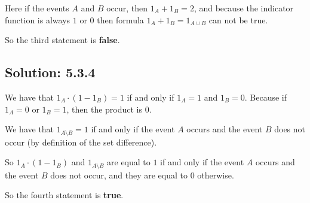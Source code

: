 Here if the events $A$ and $B$ occur, then $1_A + 1_B = 2$, and because the indicator function
is always $1$ or $0$ then formula $1_A + 1_B = 1_{A\cup B}$ can not be true.

So the third statement is \textbf{false}.


\subsection*{Solution: 5.3.4}

We have that $1_A \cdot (1 - 1_B) = 1$ if and only if $1_A = 1$ and $1_B = 0$.
Because if $1_A = 0$ or $1_B = 1$, then the product is $0$.

We have that $1_{A\setminus B} = 1$ if and only if the event $A$ occurs
and the event $B$ does not occur (by definition of the set difference).

So $1_A \cdot (1 - 1_B)$ and $1_{A\setminus B}$ are equal to $1$ if and only if
the event $A$ occurs and the event $B$ does not occur, and they are equal to $0$ otherwise.

So the fourth statement is \textbf{true}.